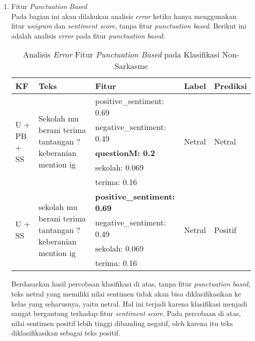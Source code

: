 \begin{enumerate}[leftmargin=*,nolistsep]
	\item Fitur \textit{Punctuation Based}\\
	Pada bagian ini akan dilakukan analisis \textit{error} ketika hanya menggunakan fitur \textit{unigram }dan \textit{sentiment score}, tanpa fitur \textit{punctuation based}. Berikut ini adalah analisis	\textit{error} pada fitur \textit{punctuation based}:
	\begin{table}[H]
		\caption{Analisis \textit{Error} Fitur \textit{Punctuation Based} pada Klasifikasi Non-Sarkasme}
		\centering
		\small
		\begin{adjustbox}{width=1\textwidth}
		\begin{tabular}{|p{1.7cm}|p{3.15cm}|p{4.3cm}|p{1cm}|p{1.3cm}|}
			\hline
			\textbf{KF} & \textbf{Teks} & \textbf{Fitur} & \textbf{Label} & \textbf{Prediksi} \\
			\hline
			\multirow{5}{*}{\parbox{1.7cm}{U + PB + SS}}& \multirow{5}{*}{\parbox{3.15cm}{Sekolah mu berani terima tantangan ? keberanian mention ig}} & positive\_sentiment: 0.69
			& \multirow{5}{*}{\parbox{1cm}{Netral}} & \multirow{5}{*}{\parbox{1.3cm}{Netral}} \\
			\cline{3-3}
			& &negative\_sentiment: 0.49 & & \\
			\cline{3-3}
			& &  \textbf{questionM: 0.2} & & \\
			\cline{3-3}
			& & sekolah: 0.069 & & \\
			\cline{3-3}
			 & & terima: 0.16 & & \\
			\hline
			\multirow{4}{*}{\parbox{1.7cm}{U + SS}} & \multirow{4}{*}{\parbox{3.15cm}{sekolah mu berani terima tantangan ? keberanian mention ig}} & \textbf{positive\_sentiment: 0.69} & \multirow{4}{*}{\parbox{1cm}{Netral}} & \multirow{4}{*}{\parbox{1.3cm}{Positif}} \\
			\cline{3-3}
			& & negative\_sentiment: 0.49 & & \\
			\cline{3-3}
			& & sekolah: 0.069 & & \\
			\cline{3-3}
			& & terima: 0.16 & & \\
			\hline
		\end{tabular}
		\end{adjustbox}
	\end{table}
	Berdasarkan hasil percobaan klasifikasi di atas, tanpa fitur \textit{punctuation based},\textit{ }teks netral yang memiliki nilai sentimen tidak akan bisa diklasifikasikan ke kelas yang seharusnya, yaitu netral. Hal ini terjadi karena klasifikasi menjadi sangat bergantung terhadap fitur \textit{sentiment} \textit{score}. Pada percobaan di atas, nilai sentimen positif lebih tinggi dibanding negatif, oleh karena itu teks diklasifikasikan sebagai teks positif.
\end{enumerate}

